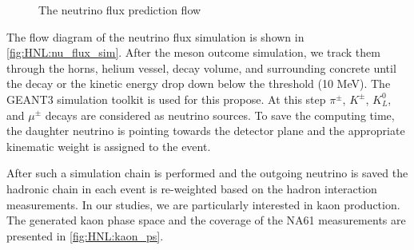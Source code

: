 \documentclass[../main.tex]{subfiles}
\begin{document}
\begin{figure}[!ht]
    \centering

    \caption{The neutrino flux prediction flow}
    \label{fig:HNL:nu_flux_sim}
\end{figure}

The flow diagram of the neutrino flux simulation is shown in \autoref{fig:HNL:nu_flux_sim}. After the meson outcome simulation, we track them through the horns, helium vessel, decay volume, and surrounding concrete until the decay or the kinetic energy drop down below the threshold (10 MeV). The GEANT3 simulation toolkit is used for this propose. At this step $\pi^\pm$, $K^\pm$, $K_L^0$, and $\mu^\pm$ decays are considered as neutrino sources. To save the computing time, the daughter neutrino is pointing towards the detector plane and the appropriate kinematic weight is assigned to the event.

After such a simulation chain is performed and the outgoing neutrino is saved the hadronic chain in each event is re-weighted based on the hadron interaction measurements. In our studies, we are particularly interested in kaon production. The generated kaon phase space and the coverage of the NA61 measurements are presented in \autoref{fig:HNL:kaon_ps}.
\end{document}

